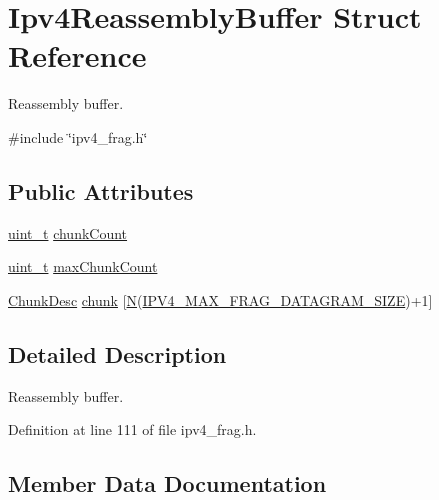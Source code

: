 \hypertarget{structIpv4ReassemblyBuffer}{}\section{Ipv4\+Reassembly\+Buffer Struct Reference}
\label{structIpv4ReassemblyBuffer}


Reassembly buffer.  




{\ttfamily \#include \char`\"{}ipv4\+\_\+frag.\+h\char`\"{}}

\subsection*{Public Attributes}
\begin{DoxyCompactItemize}
\item 
\hyperlink{compiler__port_8h_a12a1e9b3ce141648783a82445d02b58d}{uint\+\_\+t} \hyperlink{structIpv4ReassemblyBuffer_a4a9c06b42f872f493fbc5bc39fc0b6d7}{chunk\+Count}
\item 
\hyperlink{compiler__port_8h_a12a1e9b3ce141648783a82445d02b58d}{uint\+\_\+t} \hyperlink{structIpv4ReassemblyBuffer_ae12403b25f09034a743e45debe206c69}{max\+Chunk\+Count}
\item 
\hyperlink{structChunkDesc}{Chunk\+Desc} \hyperlink{structIpv4ReassemblyBuffer_a2a7cff0216aa758d344ffbeb6be481cf}{chunk} \mbox{[}\hyperlink{net__mem_8h_a5d7f6248b8dd365190e7562d4e14a4f3}{N}(\hyperlink{net__config_8h_a3f9a052384f25fdf9c6f5c32cb32e9ce}{I\+P\+V4\+\_\+\+M\+A\+X\+\_\+\+F\+R\+A\+G\+\_\+\+D\+A\+T\+A\+G\+R\+A\+M\+\_\+\+S\+I\+ZE})+1\mbox{]}
\end{DoxyCompactItemize}


\subsection{Detailed Description}
Reassembly buffer. 

Definition at line 111 of file ipv4\+\_\+frag.\+h.



\subsection{Member Data Documentation}
\mbox{\label{structIpv4ReassemblyBuffer_a2a7cff0216aa758d344ffbeb6be481cf}} 
